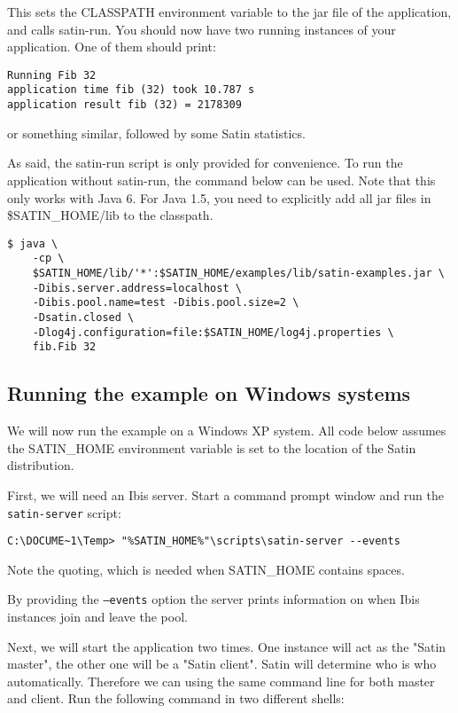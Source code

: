\documentclass[a4paper,10pt]{article}
\begin{document}
This sets the CLASSPATH environment variable to the jar file of the
application, and calls satin-run. You should now have two running
instances of your application. One of them should print:

\noindent
{\small
\begin{verbatim}
Running Fib 32
application time fib (32) took 10.787 s
application result fib (32) = 2178309
\end{verbatim}
}
\noindent

or something similar, followed by some Satin statistics.

As said, the satin-run script is only provided for convenience. To run
the application without satin-run, the command below can be used.
Note that this only works with Java 6. For Java 1.5, you need to
explicitly add all jar files in \$SATIN\_HOME/lib to the classpath.

\noindent
{\small
\begin{verbatim}
$ java \
    -cp \
    $SATIN_HOME/lib/'*':$SATIN_HOME/examples/lib/satin-examples.jar \
    -Dibis.server.address=localhost \
    -Dibis.pool.name=test -Dibis.pool.size=2 \
    -Dsatin.closed \
    -Dlog4j.configuration=file:$SATIN_HOME/log4j.properties \
    fib.Fib 32
\end{verbatim}
}
\noindent

\subsection{Running the example on Windows systems}

We will now run the example on a Windows XP system.
All code below assumes the SATIN\_HOME
environment variable is set to the location of the Satin distribution.

First, we will need an Ibis server. Start a command prompt window and
run the \texttt{satin-server} script:
\noindent
{\small
\begin{verbatim}
C:\DOCUME~1\Temp> "%SATIN_HOME%"\scripts\satin-server --events
\end{verbatim}
}
\noindent

Note the quoting, which is needed when SATIN\_HOME contains spaces.

By providing the \texttt{--events} option the server
prints information on when Ibis instances join and leave the pool.

Next, we will start the application two times. One instance will act as the
"Satin master", the other one will be a "Satin client".
Satin will determine who is who automatically. Therefore we can using the same
command line for both master and client.
Run the following command in two different shells:
\end{document}
